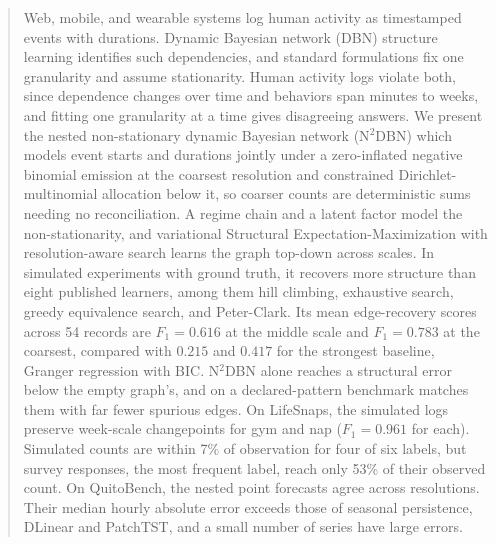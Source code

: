 \documentclass[sigconf]{acmart}
\begin{document}
\begin{abstract}
Web, mobile, and wearable systems log human activity as timestamped events with durations. Dynamic Bayesian network (DBN) structure learning identifies such dependencies, and standard formulations fix one granularity and assume stationarity. Human activity logs violate both, since dependence changes over time and behaviors span minutes to weeks, and fitting one granularity at a time gives disagreeing answers. We present the nested non-stationary dynamic Bayesian network (N$^2$DBN) which models event starts and durations jointly under a zero-inflated negative binomial emission at the coarsest resolution and constrained Dirichlet-multinomial allocation below it, so coarser counts are deterministic sums needing no reconciliation. A regime chain and a latent factor model the non-stationarity, and variational Structural Expectation-Maximization with resolution-aware search learns the graph top-down across scales. In simulated experiments with ground truth, it recovers more structure than eight published learners, among them hill climbing, exhaustive search, greedy equivalence search, and Peter-Clark. Its mean edge-recovery scores across 54 records are $F_1=0.616$ at the middle scale and $F_1=0.783$ at the coarsest, compared with $0.215$ and $0.417$ for the strongest baseline, Granger regression with BIC. N$^2$DBN alone reaches a structural error below the empty graph's, and on a declared-pattern benchmark matches them with far fewer spurious edges. On LifeSnaps, the simulated logs preserve week-scale changepoints for gym and nap ($F_1=0.961$ for each). Simulated counts are within 7\% of observation for four of six labels, but survey responses, the most frequent label, reach only 53\% of their observed count. On QuitoBench, the nested point forecasts agree across resolutions. Their median hourly absolute error exceeds those of seasonal persistence, DLinear and PatchTST, and a small number of series have large errors.

\end{abstract}
\end{document}
